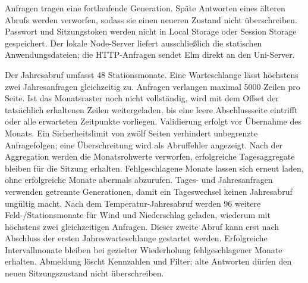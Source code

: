 \documentclass[usegeometry=true]{scrartcl}
\begin{document}
Anfragen tragen eine fortlaufende Generation. Späte Antworten eines älteren
Abrufs werden verworfen, sodass sie einen neueren Zustand nicht
überschreiben. Passwort und Sitzungstoken werden nicht in Local Storage oder
Session Storage gespeichert. Der lokale Node-Server liefert ausschließlich
die statischen Anwendungsdateien; die HTTP-Anfragen sendet Elm direkt an den
Uni-Server.

Der Jahresabruf umfasst 48 Stationsmonate. Eine Warteschlange lässt höchstens
zwei Jahresanfragen gleichzeitig zu. Anfragen verlangen maximal 5000 Zeilen
pro Seite. Ist das Monatsraster noch nicht vollständig, wird mit dem
Offset der tatsächlich erhaltenen Zeilen weitergeladen, bis eine leere
Abschlussseite eintrifft oder alle erwarteten Zeitpunkte vorliegen.
Validierung erfolgt vor Übernahme des Monats. Ein Sicherheitslimit von zwölf
Seiten verhindert unbegrenzte Anfragefolgen; eine Überschreitung wird als
Abruffehler angezeigt. Nach der Aggregation werden die Monatsrohwerte
verworfen, erfolgreiche Tagesaggregate bleiben für die Sitzung erhalten.
Fehlgeschlagene Monate lassen sich erneut laden, ohne erfolgreiche Monate
abermals abzurufen. Tages- und Jahresanfragen verwenden getrennte
Generationen, damit ein Tageswechsel keinen Jahresabruf ungültig macht.
Nach dem Temperatur-Jahresabruf werden 96 weitere Feld-/Stationsmonate
für Wind und Niederschlag geladen, wiederum mit höchstens zwei
gleichzeitigen Anfragen. Dieser zweite Abruf kann erst nach Abschluss der
ersten Jahreswarteschlange gestartet werden. Erfolgreiche Intervallmonate
bleiben bei gezielter Wiederholung fehlgeschlagener Monate erhalten.
Abmeldung löscht Kennzahlen und Filter; alte Antworten dürfen den neuen
Sitzungszustand nicht überschreiben.
\end{document}
